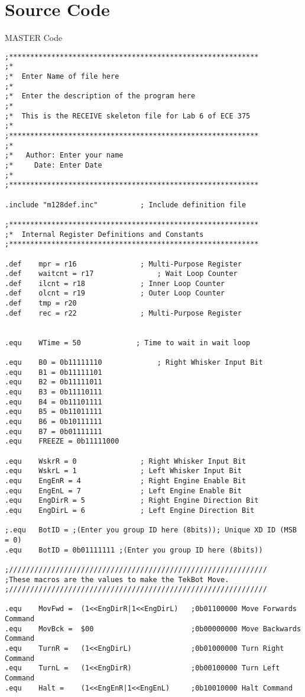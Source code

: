 \documentclass[12pt,letterpaper]{article}
\begin{document}
\section{Source Code}
MASTER Code
\begin{verbatim}
;***********************************************************
;*
;*	Enter Name of file here
;*
;*	Enter the description of the program here
;*
;*	This is the RECEIVE skeleton file for Lab 6 of ECE 375
;*
;***********************************************************
;*
;*	 Author: Enter your name
;*	   Date: Enter Date
;*
;***********************************************************

.include "m128def.inc"			; Include definition file

;***********************************************************
;*	Internal Register Definitions and Constants
;***********************************************************

.def    mpr = r16               ; Multi-Purpose Register
.def    waitcnt = r17               ; Wait Loop Counter
.def    ilcnt = r18             ; Inner Loop Counter
.def    olcnt = r19             ; Outer Loop Counter
.def    tmp = r20
.def	rec = r22				; Multi-Purpose Register


.equ    WTime = 50             ; Time to wait in wait loop

.equ	B0 = 0b11111110				; Right Whisker Input Bit
.equ	B1 = 0b11111101
.equ	B2 = 0b11111011
.equ	B3 = 0b11110111
.equ	B4 = 0b11101111
.equ	B5 = 0b11011111
.equ	B6 = 0b10111111
.equ	B7 = 0b01111111
.equ	FREEZE = 0b11111000

.equ	WskrR = 0				; Right Whisker Input Bit
.equ	WskrL = 1				; Left Whisker Input Bit
.equ	EngEnR = 4				; Right Engine Enable Bit
.equ	EngEnL = 7				; Left Engine Enable Bit
.equ	EngDirR = 5				; Right Engine Direction Bit
.equ	EngDirL = 6				; Left Engine Direction Bit

;.equ	BotID = ;(Enter you group ID here (8bits)); Unique XD ID (MSB = 0)
.equ	BotID = 0b01111111 ;(Enter you group ID here (8bits))

;/////////////////////////////////////////////////////////////
;These macros are the values to make the TekBot Move.
;/////////////////////////////////////////////////////////////

.equ	MovFwd =  (1<<EngDirR|1<<EngDirL)	;0b01100000 Move Forwards Command
.equ	MovBck =  $00						;0b00000000 Move Backwards Command
.equ	TurnR =   (1<<EngDirL)				;0b01000000 Turn Right Command
.equ	TurnL =   (1<<EngDirR)				;0b00100000 Turn Left Command
.equ	Halt =    (1<<EngEnR|1<<EngEnL)		;0b10010000 Halt Command


\end{verbatim}
\end{document}
